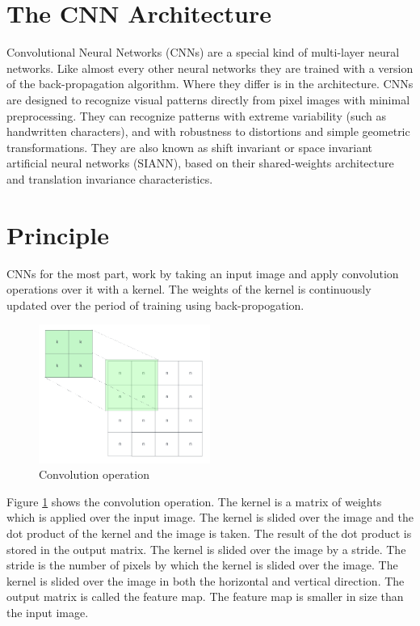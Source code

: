 \documentclass[wide]{adonis}
\begin{document}
\maketitle

\section{The CNN Architecture}

Convolutional Neural Networks (CNNs) are a special kind of multi-layer neural networks. Like almost every other neural networks they are trained with a version of the back-propagation algorithm. Where they differ is in the architecture. CNNs are designed to recognize visual patterns directly from pixel images with minimal preprocessing. They can recognize patterns with extreme variability (such as handwritten characters), and with robustness to distortions and simple geometric transformations. They are also known as shift invariant or space invariant artificial neural networks (SIANN), based on their shared-weights architecture and translation invariance characteristics.

\section{Principle}

CNNs for the most part, work by taking an input image and apply convolution operations over it with a kernel. The weights of the kernel is continuously updated over the period of training using back-propogation.

\begin{figure}
	\centering
	\includegraphics[width=0.5\textwidth]{images/convolution.png}
	\caption{Convolution operation}
	\label{convolution}
\end{figure}

Figure \ref{convolution} shows the convolution operation. The kernel is a matrix of weights which is applied over the input image. The kernel is slided over the image and the dot product of the kernel and the image is taken. The result of the dot product is stored in the output matrix. The kernel is slided over the image by a stride. The stride is the number of pixels by which the kernel is slided over the image. The kernel is slided over the image in both the horizontal and vertical direction. The output matrix is called the feature map. The feature map is smaller in size than the input image.
\end{document}
